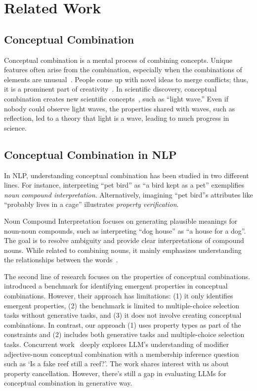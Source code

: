 \section{Related Work}
\subsection{Conceptual Combination}
Conceptual combination is a mental process of combining concepts. Unique features often arise from the combination, especially when the combinations of elements are unusual~\cite{estes2002emergence, ward2007creative}.
People come up with novel ideas to merge conflicts; thus, it is a prominent part of creativity~\cite{hampton1997emergent}.
In scientific discovery, conceptual combination creates new scientific concepts~\cite{thagard1984conceptual}, such as ``light wave.'' Even if nobody could observe light waves, the properties shared with waves, such as reflection, led to a theory that light is a wave, leading to much progress in science.

\subsection{Conceptual Combination in NLP} 
In NLP, understanding conceptual combination has been studied in two different lines. For instance, interpreting ``pet bird'' as ``a bird kept as a pet'' exemplifies \textit{noun compound interpretation}. Alternatively, imagining ``pet bird''s attributes like ``probably lives in a cage'' illustrates \textit{property verification}.

Noun Compound Interpretation focuses on generating plausible meanings for noun-noun compounds, such as interpreting ``dog house'' as ``a house for a dog''. The goal is to resolve ambiguity and provide clear interpretations of compound nouns. While related to combining nouns, it mainly emphasizes understanding the relationships between the words~\cite{hendrickx2013semeval,shwartz2018olive,shwartz2019still, coil2023chocolate, rambelli2024can}.

The second line of research focuses on the properties of conceptual combinations. \citet{srivastava2023bigbench} introduced a benchmark for identifying emergent properties in conceptual combinations. However, their approach has limitations: (1) it only identifies emergent properties, (2) the benchmark is limited to multiple-choice selection tasks without generative tasks, and (3) it does not involve creating conceptual combinations. In contrast, our approach (1) uses property types as part of the constraints and (2) includes both generative tasks and multiple-choice selection tasks. Concurrent work~\cite{ross2024artificial} deeply explores LLM's understanding of modifier adjective-noun conceptual combination with a membership inference question such as `Is a fake reef still a reef?'. The work shares interest with us about property cancellation. However, there's still a gap in evaluating LLMs for conceptual combination in generative way.
